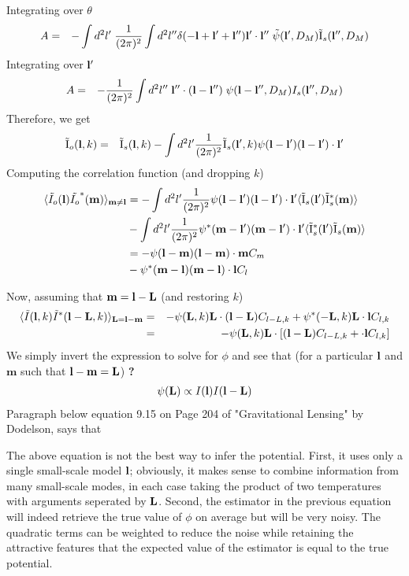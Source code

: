 \documentclass[12pt]{article}
\newcommand{\beq}{\begin{equation}}
\newcommand{\eeq}{\end{equation}}
\newcommand{\beqa}{\begin{eqnarray}}
\newcommand{\eeqa}{\end{eqnarray}}
\newcommand{\beqal}{\begin{aligned}}
\newcommand{\eeqal}{\end{aligned}}
\def\l{{\bf l}}
\def\L{{\bf L}}
\def\il{{\tilde{\rm I}}}
\numberwithin{equation}{section}
\begin{document}
Integrating over $ \theta $
\begin{eqnarray}
A &= &- \int d^2 l' \; \frac{1}{(2\pi)^2}  \int d^2 l'' \delta(-\l + \l' + \l'') \l' \cdot \l'' \; \tilde{\psi}(\l', D_M) \il_s(\l'',D_M)
\end{eqnarray}
Integrating over $ \l' $
\begin{eqnarray}
A &= &- \frac{1}{(2\pi)^2} \int d^2 l'' \;  \l'' \cdot (\l - \l'') \; \psi(\l - \l'', D_M) I_s(\l'',D_M)
\end{eqnarray}
Therefore, we get
\begin{eqnarray}
\il_o(\l,k) &=& \il_s(\l, k) - \int {d^2l'} \frac{1}{(2\pi)^2}\il_s(\l',k)\psi(\l-\l')(\l-\l')\cdot
\l'
\end{eqnarray}
Computing the correlation function (and dropping $ k $)
\beq
\beqal
\langle \tilde I_o (\l) \tilde{I_o}^*(\textbf{m}) \rangle _{\textbf{m} \neq \textbf{l}} &= - \int {d^2 l'}  \frac{1}{(2\pi)^2}\psi(\l-\l')(\l-\l')\cdot \l'  \langle \il_s(\l^\prime) \il_s^*(\textbf{m})  \rangle 
\\
& -  \int {d^2 l'}  \frac{1}{(2\pi)^2}\psi^*(\textbf{m}-\l')(\textbf{m}-\l')\cdot \l'  \langle \il_s^*(\l^\prime) \il_s(\textbf{m}) \rangle
 \\
 &= -  \psi(\l-\textbf{m})(\l-\textbf{m})\cdot \textbf{m}  C_m 
 \\
&  -   \psi^*(\textbf{m}-\l)(\textbf{m}-\l)\cdot \l  C_l
\eeqal
\eeq

Now, assuming that $ \textbf{m} = \l- \L $ (and restoring $ k $)
\begin{eqnarray}
\langle \tilde I (\l,k) \tilde{I}^*(\l - \L, k) \rangle _{\textbf{L}  = \l - \textbf{m}} &=& -  \psi(\L, k)\L\cdot (\textbf{l} - \textbf{L})  C_{l - L, k} +   \psi^*(-\L, k)\L\cdot \l  C_{l, k} \\
&=& -  \psi(\L, k)\L \cdot \left[(\textbf{l} - \textbf{L})  C_{l - L, k} +  \cdot \l  C_{l, k}\right]
\end{eqnarray}
%
We simply invert the expression to solve for $ \phi $ and see that (for a particular $ \l $ and $ \textbf{m} $ such that $ \l  - \textbf{m} = \L$) \textbf{?}
\beqa
\psi(\L) \propto I(\l) I(\l - \L)
\eeqa
Paragraph below equation 9.15 on Page 204 of "Gravitational Lensing" by Dodelson, says that	

The above equation is not the best way to infer the potential. First, it uses only a single small-scale model $ \l $; obviously, it makes sense to combine information from many small-scale modes, in each case taking the product of two temperatures with arguments seperated by $ \L $. Second, the estimator in the previous equation will indeed retrieve the true value of $ \phi $ on average but will be very noisy. The quadratic terms can be weighted to reduce the noise while retaining the attractive features that the expected value of the estimator is equal to the true potential.
\end{document}
